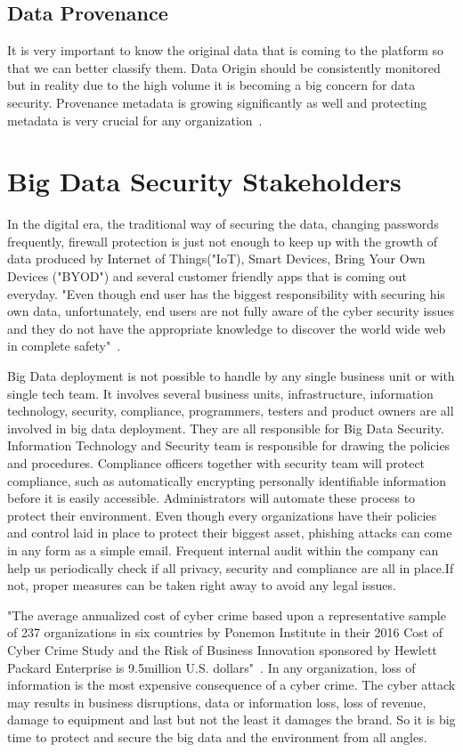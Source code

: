 \subsection{Data Provenance}
It is very important to know the original data that is coming
to the platform so that we can better classify them. Data
Origin should be consistently monitored but in reality 
due to the high volume it is becoming a big concern for 
data security. Provenance metadata is growing significantly 
as well and protecting metadata is very crucial 
for any organization~\cite{dataconomy}.

\section{Big Data Security Stakeholders}
In the digital era, the traditional way of securing the data,
changing passwords frequently, firewall protection is just not
enough to keep up with the growth of data produced by
Internet of Things("IoT), Smart Devices, Bring Your Own
Devices ("BYOD") and several customer friendly apps that
is coming out everyday. "Even though end user has the
biggest responsibility with securing his own data, unfortunately, 
end users are not fully aware of the cyber security issues 
and they do not have the appropriate knowledge to discover 
the world wide web in complete safety"~\cite{realdolmen}.

Big Data deployment is not possible to handle by any single 
business unit or with single tech team. It involves several
business units, infrastructure, information technology, 
security, compliance, programmers, testers and product
owners are all involved in big data deployment. They are 
all responsible for Big Data Security. Information Technology
and Security team is responsible for drawing the policies and 
procedures. Compliance officers together with security team
will protect compliance, such as automatically encrypting
personally identifiable information before it is easily 
accessible. Administrators will automate these process to
protect their environment. Even though every organizations
have their policies and control laid in place to protect their
biggest asset, phishing attacks can come in any form as a simple
email. Frequent internal audit within the company can help us
periodically check if all privacy, security and compliance
are all in place.If not, proper measures can be taken right
away to avoid any legal issues.

"The average annualized cost of cyber crime based upon a
representative sample of 237 organizations in six countries
by Ponemon Institute in their 2016 Cost of Cyber Crime Study
and the Risk of Business Innovation sponsored by Hewlett 
Packard Enterprise is 9.5million U.S. dollars"~\cite{ponemon}. 
In any organization, loss of information is the most expensive
consequence of a cyber crime. The cyber attack may results in
business disruptions, data or information loss, loss of revenue,
damage to equipment and last but not the least it damages 
the brand. So it is big time to protect and secure the big 
data and the environment from all angles.

